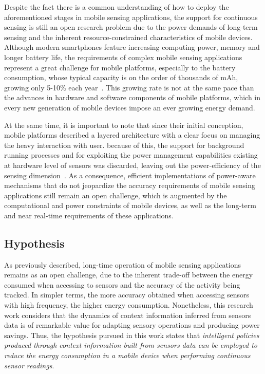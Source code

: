 \documentclass[12pt]{article}
\numberwithin{equation}{section}
\numberwithin{table}{section}
\numberwithin{figure}{section}
\begin{document}
Despite the fact there is a common understanding of how to deploy the aforementioned stages in mobile sensing applications, the support for continuous sensing is still an open research problem due to the power demands of long-term sensing and the inherent resource-constrained characteristics of mobile devices.
Although modern smartphones feature increasing computing power, memory and longer battery life, the requirements of complex mobile sensing applications represent a great challenge for mobile platforms, especially to the battery consumption, whose typical capacity is on the order of thousands of mAh, growing only 5-10\% each year~\cite{Ma2012,Evarts2015}. 
This growing rate is not at the same pace than the advances in hardware and software components of mobile platforms, which in every new generation of mobile devices impose an ever growing energy demand.

At the same time, it is important to note that since their initial conception, mobile platforms described a layered architecture with a clear focus on managing the heavy interaction with user.
because of this, the support for background running processes and for exploiting the power management capabilities existing at hardware level of sensors was discarded, leaving out the power-efficiency of the sensing dimension~\cite{Priyantha2011}.
As a consequence, efficient implementations of power-aware mechanisms that do not jeopardize the accuracy requirements of mobile sensing applications still remain an open challenge, which is augmented by the computational and power constraints of mobile devices, as well as the long-term and near real-time requirements of these applications.


\subsection{Hypothesis} 
\label{sub:hypothesis}
As previously described, long-time operation of mobile sensing applications remains as an open challenge, due to the inherent trade-off between the energy consumed when accessing to sensors and the accuracy of the activity being tracked.
In simpler terms, the more accuracy obtained when accessing sensors with high frequency, the higher energy consumption.
Nonetheless, this research work considers that the dynamics of context information inferred from sensors data is of remarkable value for adapting sensory operations and producing power savings.
Thus, the hypothesis pursued in this work states that \emph{intelligent policies produced through context information built from sensors data can be employed to reduce the energy consumption in a mobile device when performing continuous sensor readings}.
\end{document}
